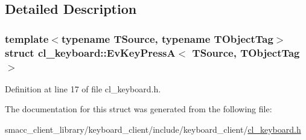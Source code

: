 \subsection{Detailed Description}
\subsubsection*{template$<$typename T\+Source, typename T\+Object\+Tag$>$\newline
struct cl\+\_\+keyboard\+::\+Ev\+Key\+Press\+A$<$ T\+Source, T\+Object\+Tag $>$}



Definition at line 17 of file cl\+\_\+keyboard.\+h.



The documentation for this struct was generated from the following file\+:\begin{DoxyCompactItemize}
\item 
smacc\+\_\+client\+\_\+library/keyboard\+\_\+client/include/keyboard\+\_\+client/\hyperlink{cl__keyboard_8h}{cl\+\_\+keyboard.\+h}\end{DoxyCompactItemize}
